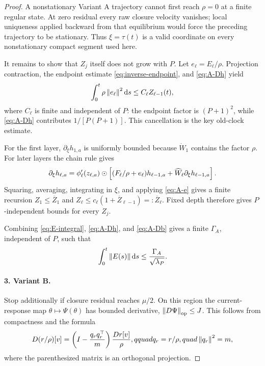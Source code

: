 \begin{proof}
A nonstationary Variant A trajectory cannot first reach $\rho=0$ at a finite
regular state.  At zero residual every raw closure velocity vanishes; local
uniqueness applied backward from that equilibrium would force the preceding
trajectory to be stationary.  Thus $\xi=\tau(t)$ is a valid coordinate on
every nonstationary compact segment used here.

It remains to show that $Z_j$ itself does not grow with $P$.  Let
$e_\ell=E_\ell/\rho$.  Projection contraction, the endpoint estimate
\eqref{eq:inverse-endpoint}, and \eqref{eq:A-Dh} yield
\begin{equation}
 \int_0^t\rho\left\lVert e_\ell\right\rVert^2\mathop{}\!\mathrm d s
 \le C_\ell Z_{\ell-1}(t),
 \label{eq:A-e}
\end{equation}
where $C_\ell$ is finite and independent of $P$: the endpoint factor is
$(P+1)^2$, while \eqref{eq:A-Dh} contributes
$1/[P(P+1)]$.  This cancellation is the key old-clock estimate.

For the first layer, $\partial_\xi h_{1,a}$ is uniformly bounded because
$\dot W_1$ contains the factor $\rho$.  For later layers the chain rule gives
\begin{equation}
 \partial_\xi h_{\ell,a}
 =\phi_\ell'(z_{\ell,a})\odot\left[
  (F_\ell/\rho+e_\ell)h_{\ell-1,a}
  +\widehat W_\ell\partial_\xi h_{\ell-1,a}\right].
 \label{eq:A-chain}
\end{equation}
Squaring, averaging, integrating in $\xi$, and applying
\eqref{eq:A-e} gives a finite recursion
$Z_1\le\overline Z_1$ and
$Z_\ell\le c_\ell(1+\overline Z_{\ell-1})=:\overline Z_\ell$.
Fixed depth therefore gives $P$-independent bounds for every $Z_j$.

Combining \eqref{eq:E-integral}, \eqref{eq:A-Dh}, and
\eqref{eq:A-Db} gives a finite $\Gamma_A$, independent of $P$, such that
\begin{equation}
 \int_0^t\left\lVert E(s)\right\rVert\mathop{}\!\mathrm d s\le\frac{\Gamma_A}{\sqrt{\lambda_P}}.
 \label{eq:A-defect}
\end{equation}

\paragraph{3. Variant B.}
Stop additionally if closure residual reaches $\mu/2$.  On this region the
current-response map $\theta\mapsto\Psi(\theta)$ has bounded derivative,
$\left\lVert D\Psi\right\rVert_{\mathrm{op}}\le J$.  This follows from compactness and the
formula
\begin{equation}
 D(r/\rho)[v]=\left(I-\frac{q_rq_r^\top}{m}\right)
 \frac{Dr[v]}{\rho},qquad q_r=r/\rho,quad \left\lVert q_r\right\rVert^2=m,
\end{equation}
where the parenthesized matrix is an orthogonal projection.


\end{proof}
